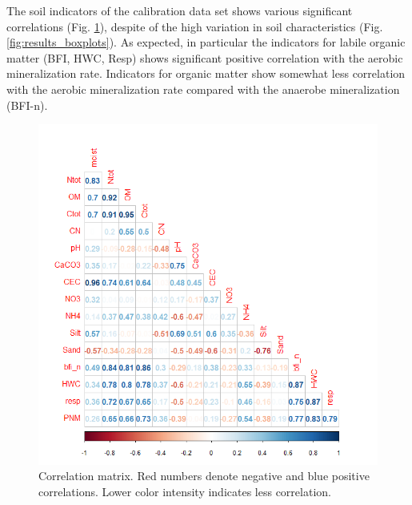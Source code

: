 \documentclass[10pt,twoside,dutch,english]{report}
\begin{document}
The soil indicators of the calibration data set shows various significant correlations (Fig. \ref{fig:results_corr}), despite of the high variation in soil characteristics (Fig. \ref{fig:results_boxplots}). As expected, in particular the indicators for labile organic matter (BFI, HWC, Resp) shows significant positive correlation with the aerobic mineralization rate. Indicators for organic matter show somewhat less correlation with the aerobic mineralization rate compared with the anaerobe mineralization (BFI-n).
	\begin{figure}[h] %
	\centering
	\includegraphics[width=0.7\linewidth]{results_corr}
	\caption{Correlation matrix. Red numbers denote negative and blue positive correlations. Lower color intensity indicates less correlation.}
	\label{fig:results_corr}
\end{figure}
\end{document}
